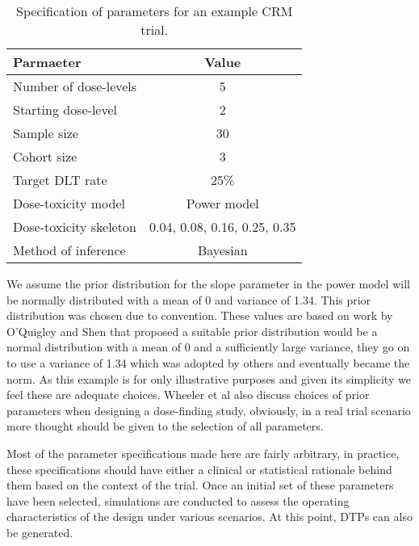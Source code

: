 \begin{table}[h!]
	\centering
	\caption{Specification of parameters for an example CRM trial. }
	\label{tab_tite-dtp:exampleCRMspecs}
	\begin{tabular}{l|c}
		\hline
		\textbf{Parmaeter}     & \textbf{Value}               \\ \hline
		Number of dose-levels  & 5                            \\
		Starting dose-level    & 2                            \\
		Sample size            & 30                           \\
		Cohort size            & 3                            \\
		Target DLT rate        & 25\%                         \\
		Dose-toxicity model    & Power model                  \\
		Dose-toxicity skeleton & 0.04, 0.08, 0.16, 0.25, 0.35 \\
		Method of inference    & Bayesian                     \\ \hline
	\end{tabular}
\end{table}

We assume the prior distribution for the slope parameter in the power model will be normally distributed with a mean of 0 and variance of 1.34. This prior distribution was chosen due to convention. These values are based on work by O'Quigley and Shen \cite{oquigleyContinualReassessmentMethod1996} that proposed a suitable prior distribution would be a normal distribution with a mean of 0 and a sufficiently large variance, they go on to use a variance of 1.34 which was adopted by others and eventually became the norm. As this example is for only illustrative purposes and given its simplicity we feel these are adequate choices. Wheeler et al \cite{wheelerHowDesignDosefinding2019} also discuss choices of prior parameters when designing a dose-finding study, obviously, in a real trial scenario more thought should be given to the selection of all parameters. 

Most of the parameter specifications made here are fairly arbitrary, in practice, these specifications should have either a clinical or statistical rationale behind them based on the context of the trial. Once an initial set of these parameters have been selected, simulations are conducted to assess the operating characteristics of the design under various scenarios. At this point, DTPs can also be generated. 

